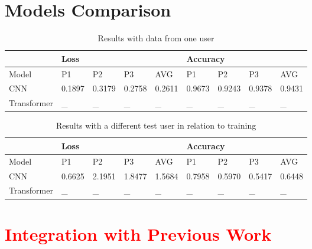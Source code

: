 \section{Models Comparison}

\begin{table}[H]
\caption{Results with data from one user}
\label{table:results_one_user}
\centering
\begin{tabular}{|l|l|l|l|l|l|l|l|l|} 
\hline
& \multicolumn{4}{|l|}{Loss} & \multicolumn{4}{|l|}{Accuracy} \\
\hline
Model & P1 & P2 & P3 & AVG & P1 & P2 & P3 & AVG \\
\hline
CNN & 0.1897 & 0.3179 & 0.2758 & 0.2611 & 0.9673 & 0.9243 & 0.9378 & 0.9431 \\
\hline
Transformer & \_ & \_ & \_ & \_ & \_ & \_ & \_ & \_ \\
\hline
\end{tabular}
\end{table}

\begin{table}[H]
\caption{Results with a different test user in relation to training}
\label{table:results_2vs1_user}
\centering
\begin{tabular}{|l|l|l|l|l|l|l|l|l|} 
\hline
& \multicolumn{4}{|l|}{Loss} & \multicolumn{4}{|l|}{Accuracy} \\
\hline
Model & P1 & P2 & P3 & AVG & P1 & P2 & P3 & AVG \\
\hline
CNN & 0.6625 & 2.1951 & 1.8477 & 1.5684 & 0.7958 & 0.5970 & 0.5417 & 0.6448 \\
\hline
Transformer & \_ & \_ & \_ & \_ & \_ & \_ & \_ & \_ \\
\hline
\end{tabular}
\end{table}

\section{\textcolor{red}{Integration with Previous Work}}
